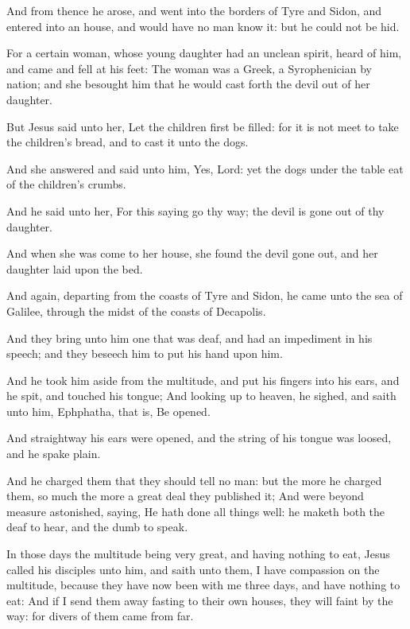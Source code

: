 \Verse And from thence he arose, and went into the borders of Tyre and Sidon, and entered into an house, and would have no man know it: but he could not be hid.

\Verse For a certain woman, whose young daughter had an unclean spirit, heard of him, and came and fell at his feet: \Verse The woman was a Greek, a Syrophenician by nation; and she besought him that he would cast forth the devil out of her daughter.

\Verse But Jesus said unto her, Let the children first be filled: for it is not meet to take the children's bread, and to cast it unto the dogs.

\Verse And she answered and said unto him, Yes, Lord: yet the dogs under the table eat of the children's crumbs.

\Verse And he said unto her, For this saying go thy way; the devil is gone out of thy daughter.

\Verse And when she was come to her house, she found the devil gone out, and her daughter laid upon the bed.

\Verse And again, departing from the coasts of Tyre and Sidon, he came unto the sea of Galilee, through the midst of the coasts of Decapolis.

\Verse And they bring unto him one that was deaf, and had an impediment in his speech; and they beseech him to put his hand upon him.

\Verse And he took him aside from the multitude, and put his fingers into his ears, and he spit, and touched his tongue; \Verse And looking up to heaven, he sighed, and saith unto him, Ephphatha, that is, Be opened.

\Verse And straightway his ears were opened, and the string of his tongue was loosed, and he spake plain.

\Verse And he charged them that they should tell no man: but the more he charged them, so much the more a great deal they published it; \Verse And were beyond measure astonished, saying, He hath done all things well: he maketh both the deaf to hear, and the dumb to speak.


\Chapter
\Verse In those days the multitude being very great, and having nothing to eat, Jesus called his disciples unto him, and saith unto them, \Verse I have compassion on the multitude, because they have now been with me three days, and have nothing to eat: \Verse And if I send them away fasting to their own houses, they will faint by the way: for divers of them came from far.

